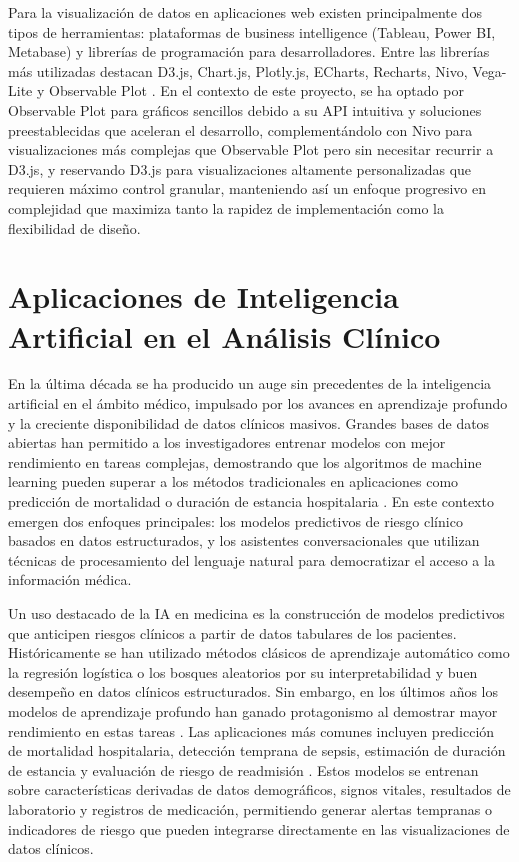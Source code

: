 Para la visualización de datos en aplicaciones web existen principalmente dos tipos de herramientas: plataformas de business intelligence (Tableau, Power BI, Metabase) y librerías de programación para desarrolladores. Entre las librerías más utilizadas destacan D3.js, Chart.js, Plotly.js, ECharts, Recharts, Nivo, Vega-Lite y Observable Plot \cite{Monterail2024_JSViz}. En el contexto de este proyecto, se ha optado por Observable Plot para gráficos sencillos debido a su API intuitiva y soluciones preestablecidas que aceleran el desarrollo, complementándolo con Nivo para visualizaciones más complejas que Observable Plot pero sin necesitar recurrir a D3.js, y reservando D3.js para visualizaciones altamente personalizadas que requieren máximo control granular, manteniendo así un enfoque progresivo en complejidad que maximiza tanto la rapidez de implementación como la flexibilidad de diseño.

\section{Aplicaciones de Inteligencia Artificial en el Análisis Clínico}

En la última década se ha producido un auge sin precedentes de la inteligencia artificial en el ámbito médico, impulsado por los avances en aprendizaje profundo y la creciente disponibilidad de datos clínicos masivos. Grandes bases de datos abiertas han permitido a los investigadores entrenar modelos con mejor rendimiento en tareas complejas, demostrando que los algoritmos de machine learning pueden superar a los métodos tradicionales en aplicaciones como predicción de mortalidad o duración de estancia hospitalaria \cite{Nature2022_MIMICDeepLearning}. En este contexto emergen dos enfoques principales: los modelos predictivos de riesgo clínico basados en datos estructurados, y los asistentes conversacionales que utilizan técnicas de procesamiento del lenguaje natural para democratizar el acceso a la información médica.

Un uso destacado de la IA en medicina es la construcción de modelos predictivos que anticipen riesgos clínicos a partir de datos tabulares de los pacientes. Históricamente se han utilizado métodos clásicos de aprendizaje automático como la regresión logística o los bosques aleatorios por su interpretabilidad y buen desempeño en datos clínicos estructurados. Sin embargo, en los últimos años los modelos de aprendizaje profundo han ganado protagonismo al demostrar mayor rendimiento en estas tareas \cite{Frontiers2022_MLPrediction}. Las aplicaciones más comunes incluyen predicción de mortalidad hospitalaria, detección temprana de sepsis, estimación de duración de estancia y evaluación de riesgo de readmisión \cite{Nature2023_SepsisML}. Estos modelos se entrenan sobre características derivadas de datos demográficos, signos vitales, resultados de laboratorio y registros de medicación, permitiendo generar alertas tempranas o indicadores de riesgo que pueden integrarse directamente en las visualizaciones de datos clínicos.

